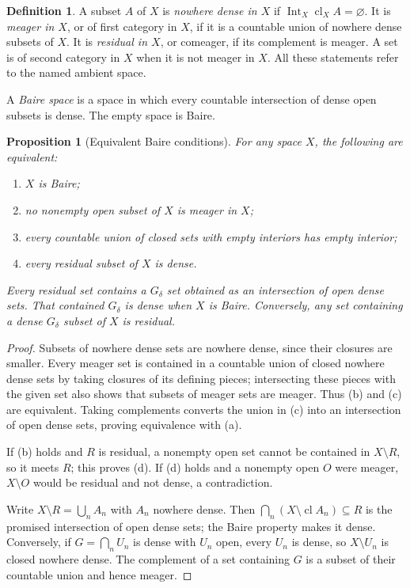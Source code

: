 \documentclass[11pt,oneside,openany]{book}
\newtheorem{proposition}[theorem]{Proposition}
\theoremstyle{definition}
\newtheorem{definition}[theorem]{Definition}
\theoremstyle{remark}
\DeclareMathOperator{\cl}{cl}
\DeclareMathOperator{\Int}{Int}
\begin{document}
\begin{definition}\label{d10:14:category-definitions}
A subset $A$ of $X$ is \emph{nowhere dense in $X$} if $\Int_X\cl_XA=\varnothing$. It is \emph{meager in $X$}, or of first category in $X$, if it is a countable union of nowhere dense subsets of $X$. It is \emph{residual in $X$}, or comeager, if its complement is meager. A set is of second category in $X$ when it is not meager in $X$. All these statements refer to the named ambient space.

A \emph{Baire space} is a space in which every countable intersection of dense open subsets is dense. The empty space is Baire.
\end{definition}

\begin{proposition}[Equivalent Baire conditions]\label{d10:14:category-equivalences}
For any space $X$, the following are equivalent:
\begin{enumerate}[label=(\alph*)]
\item $X$ is Baire;
\item no nonempty open subset of $X$ is meager in $X$;
\item every countable union of closed sets with empty interiors has empty interior;
\item every residual subset of $X$ is dense.
\end{enumerate}
Every residual set contains a $G_\delta$ set obtained as an intersection of open dense sets. That contained $G_\delta$ is dense when $X$ is Baire. Conversely, any set containing a dense $G_\delta$ subset of $X$ is residual.
\end{proposition}
\begin{proof}
Subsets of nowhere dense sets are nowhere dense, since their closures are smaller. Every meager set is contained in a countable union of closed nowhere dense sets by taking closures of its defining pieces; intersecting these pieces with the given set also shows that subsets of meager sets are meager. Thus (b) and (c) are equivalent. Taking complements converts the union in (c) into an intersection of open dense sets, proving equivalence with (a).

If (b) holds and $R$ is residual, a nonempty open set cannot be contained in $X\setminus R$, so it meets $R$; this proves (d). If (d) holds and a nonempty open $O$ were meager, $X\setminus O$ would be residual and not dense, a contradiction.

Write $X\setminus R=\bigcup_n A_n$ with $A_n$ nowhere dense. Then $\bigcap_n(X\setminus\cl A_n)\subseteq R$ is the promised intersection of open dense sets; the Baire property makes it dense. Conversely, if $G=\bigcap_nU_n$ is dense with $U_n$ open, every $U_n$ is dense, so $X\setminus U_n$ is closed nowhere dense. The complement of a set containing $G$ is a subset of their countable union and hence meager.
\end{proof}
\end{document}
